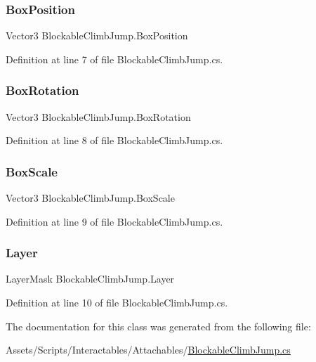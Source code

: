 \subsubsection{\texorpdfstring{Box\+Position}{BoxPosition}}
{\footnotesize\ttfamily Vector3 Blockable\+Climb\+Jump.\+Box\+Position}



Definition at line 7 of file Blockable\+Climb\+Jump.\+cs.

\mbox{\label{class_blockable_climb_jump_a1b34172df56ff53db29bbfc49e1b350b}} 
\subsubsection{\texorpdfstring{Box\+Rotation}{BoxRotation}}
{\footnotesize\ttfamily Vector3 Blockable\+Climb\+Jump.\+Box\+Rotation}



Definition at line 8 of file Blockable\+Climb\+Jump.\+cs.

\mbox{\label{class_blockable_climb_jump_ac252c4f74139236040929344a1a009b7}} 
\subsubsection{\texorpdfstring{Box\+Scale}{BoxScale}}
{\footnotesize\ttfamily Vector3 Blockable\+Climb\+Jump.\+Box\+Scale}



Definition at line 9 of file Blockable\+Climb\+Jump.\+cs.

\mbox{\label{class_blockable_climb_jump_a847685bde4d1d41e6edbdb5afa6238c5}} 
\subsubsection{\texorpdfstring{Layer}{Layer}}
{\footnotesize\ttfamily Layer\+Mask Blockable\+Climb\+Jump.\+Layer}



Definition at line 10 of file Blockable\+Climb\+Jump.\+cs.



The documentation for this class was generated from the following file\+:\begin{DoxyCompactItemize}
\item 
Assets/\+Scripts/\+Interactables/\+Attachables/\mbox{\hyperlink{_blockable_climb_jump_8cs}{Blockable\+Climb\+Jump.\+cs}}\end{DoxyCompactItemize}
